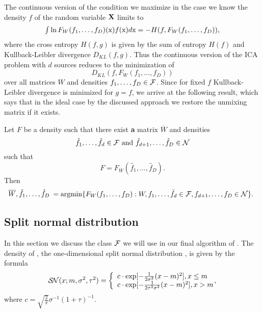 The continuous version of the condition we maximize in the case we know the density $f$
of the random variable $\mathbf{X}$ limits to
$$
\begin{array}{l}
\int \ln F_W(f_1,\ldots,f_D)(\x)f(\x) d\x %
=-H(f,F_W(f_1,\ldots,f_D)),
\end{array}
$$
where the cross entropy $H(f,g)$ is given by the sum of entropy $H(f)$
and Kullback-Leibler divergence $D_{KL}(f,g)$. Thus the continuous version of the ICA problem
with $d$ sources reduces to the minimization of 
$$
D_{KL}(f,F_W(f_1,\ldots,f_D))
$$
over all matrices $W$ and densities $f_1,\ldots,f_D \in \mathcal{F}$. Since for fixed $f$ Kullback-Leibler divergence is minimized for $g=f$, we arrive at the following result, which says that in the ideal case 
by the discussed approach we restore the unmixing matrix if it exists.

\begin{theorem}
  Let $F$ be a density such that there exist \textbf{a} matrix $\overline W$ and densities
$$
\hat f_1,\ldots,\hat f_d \in \mathcal{F} \text{ and } \hat f_{d+1},\ldots,\hat f_D \in \mathcal{N}
$$
such that 
$$
F=F_{\overline W}(\hat f_1,\ldots,\hat f_D).
$$
Then
$$
\begin{array}{l}
\overline W,\hat f_1,\ldots,\hat f_D %
\begin{array}{l}
=\argmin \{F_{W}(f_1,\ldots,f_D): %
W, f_1,\ldots,\bar f_d \in \F,f_{d+1},\ldots,f_D \in \nor
\}.
\end{array}
\end{array}
$$
\end{theorem}

\subsection{Split normal distribution}


In this section we discuss the class $\mathcal{F}$ we will use in our final algorithm of \ICA{}. The density of \SN{}, the one-dimensional split normal distribution \cite{villani2006multivariate}, is given by the formula
$$
\mbox{$\mathcal{S\!N}$}(x;m,\sigma^2,\tau^2) = \left\{ \begin{array}{l}
c \cdot \exp[-\frac{1}{2\sigma^2}(x-m)^2], \textrm{$x\leq m$}\\
c \cdot \exp[-\frac{1}{2\tau^2\sigma^2}(x-m)^2], \textrm{$x>m$}\\
\end{array} \right. \!\!\!\!,
$$
where $c=\sqrt{\frac{2}{\pi}}\sigma^{-1}(1+\tau)^{-1}$. 


